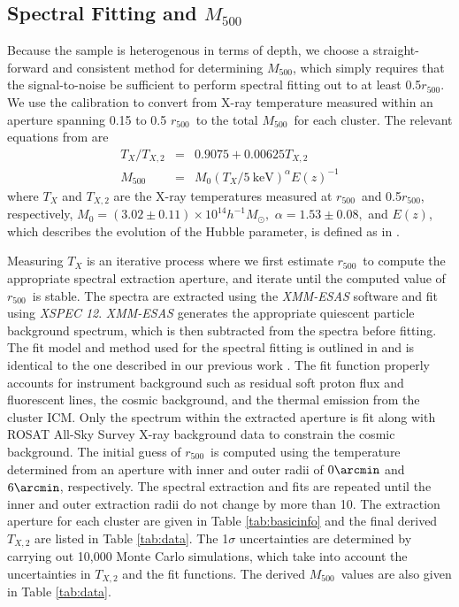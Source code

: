 \documentclass[preprint]{emulateapj}
\newcommand\rfive{$r_{500}$}
\newcommand\mfive{${M}_{500}$}
\begin{document}
\subsection{Spectral Fitting and $M_{500}$}
\label{subsec:specfit}

Because the sample is heterogenous in terms of depth, we choose a
straight-forward and consistent method for determining \mfive, which
simply requires that the signal-to-noise be sufficient to perform
spectral fitting out to at least 0.5\rfive.  We use the
\citet{vikhlinin2009} calibration to convert from X-ray temperature
measured within an aperture spanning 0.15 to 0.5 \rfive\ to the total
\mfive\ for each cluster.  The relevant equations from
\cite{vikhlinin2009} are
\begin{eqnarray}
T_X/T_{X,2} &=& 0.9075 + 0.00625 T_{X,2} \\
M_{500} &=& M_0(T_X/5\:\textrm{keV})^\alpha E(z)^{-1}
\end{eqnarray}
where $T_X$ and $T_{X,2}$ are the X-ray temperatures measured at
\rfive\ and 0.5\rfive, respectively, $M_0 =
(3.02\pm0.11)\times10^{14}h^{-1}M_\odot,$ $\alpha = 1.53\pm0.08,$ and
$E(z)$, which describes the evolution of the Hubble parameter, is
defined as in \citep[pp. 310-321]{peebles1993}.

Measuring $T_X$ is an iterative process where we first estimate
\rfive\ to compute the appropriate spectral extraction aperture, and
iterate until the computed value of \rfive\ is stable. The spectra are
extracted using the \emph{XMM-ESAS} software and fit using \emph{XSPEC
  12}.  \emph{XMM-ESAS} generates the appropriate quiescent particle
background spectrum, which is then subtracted from the spectra before
fitting. The fit model and method used for the spectral fitting is
outlined in \cite{snowden2008} and is identical to the one described
in our previous work \citep{sivanandam2009}. The fit function properly
accounts for instrument background such as residual soft proton flux
and fluorescent lines, the cosmic background, and the thermal emission
from the cluster ICM. Only the spectrum within the extracted aperture
is fit along with ROSAT All-Sky Survey X-ray background data to
constrain the cosmic background. The initial guess of \rfive\ is
computed using the temperature determined from an aperture with inner
and outer radii of $0\arcmin$ and $6\arcmin$, respectively.
The spectral extraction and fits are repeated until the inner and
outer extraction radii do not change by more than 10\arcsec. The
extraction aperture for each cluster are given in Table
\ref{tab:basicinfo} and the final derived $T_{X,2}$ are listed in
Table \ref{tab:data}.  The 1$\sigma$ uncertainties are determined by
carrying out 10,000 Monte Carlo simulations, which take into account
the uncertainties in $T_{X,2}$ and the \cite{vikhlinin2009} fit
functions. The derived \mfive\ values are also given in Table
\ref{tab:data}.
\end{document}
